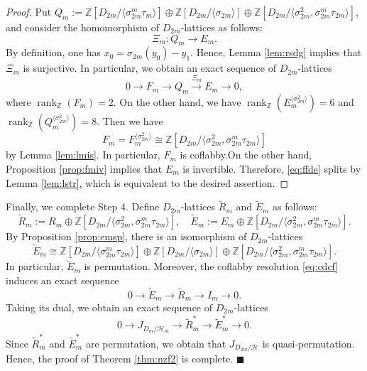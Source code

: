 \documentclass[12pt]{amsart}
\theoremstyle{plain}
\theoremstyle{definition}
\renewcommand{\qed}{\hfill$\blacksquare$\par}
\numberwithin{thm}{section}
\numberwithin{equation}{section}
\newcommand{\Z}{\mathbb{Z}}
\newcommand{\cH}{\mathcal{H}}
\DeclareMathOperator{\rk}{rank}
\begin{document}
\begin{proof}
Put $Q_{m}:=\Z[D_{2m}/\langle \sigma_{2m}^{m}\tau_{m}\rangle]\oplus \Z[D_{2m}/\langle \sigma_{2m}\rangle] \oplus \Z[D_{2m}/\langle \sigma_{2m}^{2},\sigma_{2m}^{m}\tau_{2m}\rangle]$, and consider the homomorphism of $D_{2m}$-lattices as follows: 
\begin{equation*}
\Xi_{m} \colon Q_{m} \rightarrow E_{m}. 
\end{equation*}
By definition, one has $x_{0}=\sigma_{2m}(y_{0})-y_{1}$. Hence, Lemma \ref{lem:rsdg} implies that $\Xi_{m}$ is surjective. In particular, we obtain an exact sequence of $D_{2m}$-lattices
\begin{equation}\label{eq:ffde}
0\rightarrow F_{m} \rightarrow Q_{m} \xrightarrow{\Xi_{m}}E_{m} \rightarrow 0, 
\end{equation}
where $\rk_{\Z}(F_{m})=2$. On the other hand, we have $\rk_{\Z}(E_{m}^{\langle \sigma_{2m}^{2}\rangle})=6$ and $\rk_{\Z}(Q_{m}^{\langle \sigma_{2m}^{2}\rangle})=8$. Then we have 
\begin{equation}
F_{m}=F_{m}^{\langle \sigma_{2m}^{2}\rangle}\cong \Z[D_{2m}/\langle \sigma_{2m}^{2},\sigma_{2m}^{m}\tau_{2m}\rangle]
\end{equation}
by Lemma \ref{lem:lmis}. In particular, $F_{m}$ is coflabby.On the other hand, Proposition \ref{prop:fmiv} implies that $E_{m}$ is invertible. Therefore, \eqref{eq:ffde} splits by Lemma \ref{lem:lstr}, which is equivalent to the desired assertion. 
\end{proof}

Finally, we complete Step 4. Define $D_{2m}$-lattices $\widetilde{R}_{m}$ and $\widetilde{E}_{m}$ as follows: 
\begin{equation*}
    \widetilde{R}_{m}:=R_{m}\oplus \Z[D_{2m}/\langle \sigma_{2m}^{2},\sigma_{2m}^{m}\tau_{2m}\rangle],\quad
    \widetilde{E}_{m}:=E_{m}\oplus \Z[D_{2m}/\langle \sigma_{2m}^{2},\sigma_{2m}^{m}\tau_{2m}\rangle]. 
\end{equation*}
By Proposition \ref{prop:emsp}, there is an isomorphism of $D_{2m}$-lattices
\begin{equation*}
\widetilde{E}_{m}\cong \Z[D_{2m}/\langle \sigma_{2m}^{m}\tau_{2m}\rangle]\oplus \Z[D_{2m}/\langle \sigma_{2m}\rangle]\oplus \Z[D_{2m}/\langle \sigma_{2m}^{2},\sigma_{2m}^{m}\tau_{2m}\rangle]. 
\end{equation*}
In particular, $\widetilde{E}_{m}$ is permutation. Moreover, the coflabby resolution \eqref{eq:cdcf} induces an exact sequence
\begin{equation*}
    0\rightarrow \widetilde{E}_{m}\rightarrow \widetilde{R}_{m}\rightarrow I_{m}\rightarrow 0. 
\end{equation*}
Taking its dual, we obtain an exact sequence of $D_{2m}$-lattices
\begin{equation*}
    0\rightarrow J_{D_{m}/\cH_{m}}\rightarrow \widetilde{R}_{m}^{*} \rightarrow \widetilde{E}_{m}^{*} \rightarrow 0. 
\end{equation*}
Since $ \widetilde{R}_{m}^{*}$ and $\widetilde{E}_{m}^{*}$ are permutation, we obtain that $J_{D_{2m}/\cH}$ is quasi-permutation. Hence, the proof of Theorem \ref{thm:nzf2} is complete. \qed
\end{document}
